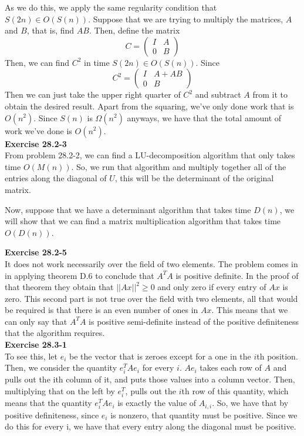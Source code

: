\documentclass{article}
\begin{document}
As we do this, we apply the same regularity condition that $S(2n)\in O(S(n))$. Suppose that we are trying to multiply the matrices, $A$ and $B$, that is, find $AB$. Then, define the matrix 
\[
C = \left( \begin{array}{cc}I&A\\0&B\end{array}\right)
\]
Then, we can find $C^2$ in time $S(2n) \in O(S(n))$. Since 
\[
C^2 = \left( \begin{array}{cc}I&A+AB\\0&B\end{array}\right)
\]
Then we can just take the upper right quarter of $C^2$ and subtract $A$ from it to obtain the desired result. Apart from the squaring, we've only done work that is $O(n^2)$. Since $S(n)$ is $\Omega(n^2)$ anyways, we have that the total amount of work we've done is $O(n^2)$.\\



\noindent\textbf{Exercise 28.2-3}\\
From problem 28.2-2, we can find a LU-decomposition algorithm that only takes time $O(M(n))$. So, we run that algorithm and multiply together all of the entries along the diagonal of $U$, this will be the determinant of the original matrix.

Now, suppose that we have a determinant algorithm that takes time $D(n)$, we will show that we can find a matrix multiplication algorithm that takes time $O(D(n))$.



\noindent\textbf{Exercise 28.2-5}\\
It does not work necessarily over the field of two elements. The problem comes in in applying theorem D.6 to conclude that $A^TA$ is positive definite. In the proof of that theorem they obtain that $||Ax||^2 \ge 0$ and only zero if every entry of $Ax$ is zero. This second part is not true over the field with two elements, all that would be required is that there is an even number of ones in $Ax$. This means that we can only say that $A^TA$ is positive semi-definite instead of the positive definiteness that the algorithm requires.\\



\noindent\textbf{Exercise 28.3-1}\\
To see this, let $e_i$ be the vector that is zeroes except for a one in the $i$th position. Then, we consider the quantity $e_i^TAe_i$ for every $i$. $Ae_i$ takes each row of $A$ and pulls out the ith column of it, and puts those values into a column vector. Then, multiplying that on the left by $e_i^T$, pulls out the $i$th row of this quantity, which means that the quantity $e_i^TAe_i$ is exactly the value of $A_{i,i}$. So, we have that by positive definiteness, since $e_i$ is nonzero, that quantity must be positive. Since we do this for every i, we have that every entry along the diagonal must be positive.\\
\end{document}

